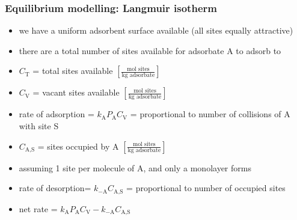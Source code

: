 \begin{frame}\frametitle{Equilibrium modelling: Langmuir isotherm}
	\begin{itemize}
		\item	we have a uniform adsorbent surface available {\tiny (all sites equally attractive)}
		\item	there are a total number of sites available for adsorbate A to adsorb to
		\item	$C_\text{T}$ = total sites available \hfill {\scriptsize $\left[\displaystyle\frac{\text{mol sites}}{\text{kg adsorbate}} \right]$}
		\pause
		\item	$C_\text{V}$ = vacant sites available \hfill {\scriptsize $\left[\displaystyle\frac{\text{mol sites}}{\text{kg adsorbate}} \right]$}
		\item	rate of adsorption = $k_\text{A} P_\text{A} C_\text{V}$ = proportional to number of collisions of A with site S
		\pause
		\item	$C_\text{A,S}$ = sites occupied by A \hfill {\scriptsize $\left[\displaystyle\frac{\text{mol sites}}{\text{kg adsorbate}} \right]$}
		\item	assuming 1 site per molecule of A, and only a monolayer forms
		\item	rate of desorption=  $k_{-\text{A}} C_\text{A,S}$ = proportional to number of occupied sites
		\item	net rate = $k_\text{A} P_\text{A} C_\text{V} - k_{-\text{A}} C_\text{A,S}$
	\end{itemize}
\end{frame}

